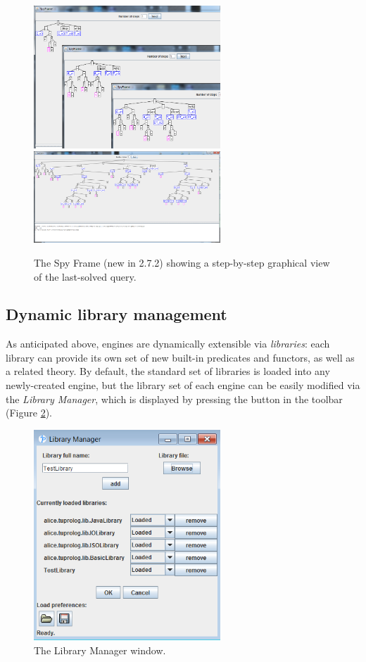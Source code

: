\begin{figure}
\centering
\includegraphics[width=7cm]{images/gui-spyframe1}
\includegraphics[width=7cm]{images/gui-spyframe2}
\caption{The Spy Frame (new in \tuprolog{} 2.7.2) showing a step-by-step graphical view of the last-solved query.}
\label{fig:gui-spyframe}
\end{figure}


\subsection{Dynamic library management}
\label{ssec:dynamic-library-management}

As anticipated above, \tuprolog{} engines are dynamically extensible via \textit{libraries}: each library can provide its own set of new built-in
predicates and functors, as well as a related theory.
%
By default, the standard set of libraries is loaded into any newly-created engine, but the library set of each engine can be easily modified via the \textit{Library Manager}, which is displayed by pressing the  button in the toolbar (Figure \ref{fig:gui-library-manager}).

\begin{figure}
\centering
\includegraphics[width=7cm]{images/gui-library-manager}
\caption{The Library Manager window.}
\label{fig:gui-library-manager}
\end{figure}

